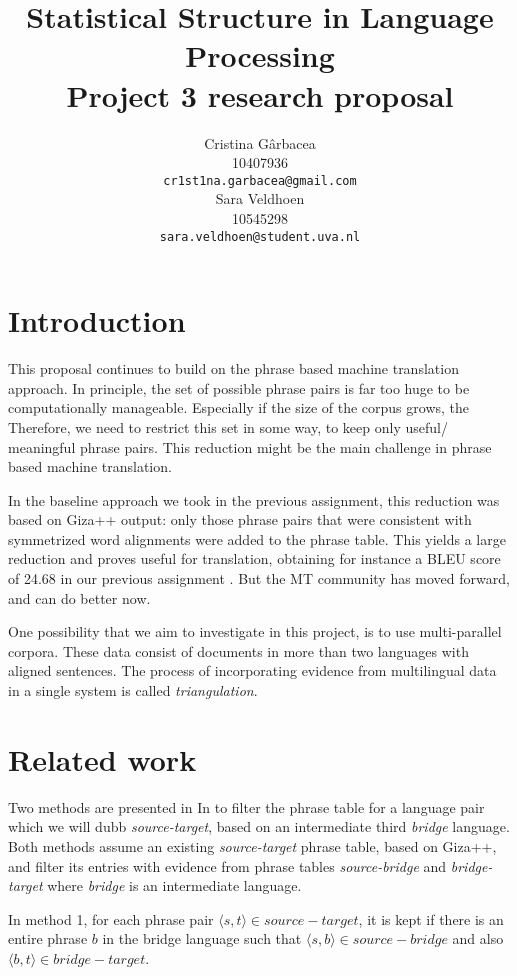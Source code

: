 \documentclass[11pt]{article}
\title{Statistical Structure in Language Processing \\Project 3 research proposal}
\author{ Cristina G\^arbacea\\
  10407936 \\
  {\small \tt cr1st1na.garbacea@gmail.com} 
  \\\And
  Sara Veldhoen \\
10545298   \\
  {\small \tt sara.veldhoen@student.uva.nl} \\}
\date{}
\begin{document}
\maketitle


\section{Introduction}
This proposal continues to build on the phrase based machine translation approach.
In principle, the set of possible phrase pairs is far too huge to be computationally manageable. 
Especially if the size of the corpus grows, the 
Therefore, we need to restrict this set in some way, to keep only useful/ meaningful phrase pairs. This reduction might be the main challenge in phrase based machine translation.

In the baseline approach we took in the previous assignment, this reduction was based on Giza++ output: only those phrase pairs that were consistent with symmetrized word alignments were added to the phrase table.
This yields a large reduction and proves useful for translation, obtaining for instance a BLEU score of 24.68 in our previous assignment \cite{previous}.
But the MT community has moved forward, and can do better now.

One possibility that we aim to investigate in this project, is to use multi-parallel corpora. These data consist of documents in more than two languages with aligned sentences. The process of incorporating evidence from multilingual data in a single system is called \emph{triangulation}. 

\section{Related work}

Two methods are presented in In \cite{chen} to filter the phrase table for a language pair which we will dubb \emph{source-target}, based on an intermediate third \emph{bridge} language. 
 Both methods assume an existing {\em source-target} phrase table, based on Giza++, and filter its entries with evidence from phrase tables {\em source-bridge} and {\em bridge-target} where {\em bridge} is an intermediate language.

In method 1, for each phrase pair $\langle s, t\rangle \in source-target$, it is kept if there is an entire phrase $b$ in the bridge language such that $\langle s,b\rangle \in source-bridge$ and also $\langle b,t\rangle \in bridge-target$.
\end{document}
